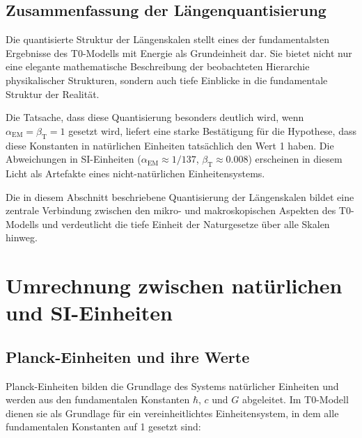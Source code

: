 \documentclass[12pt,a4paper]{article}
\newcommand{\alphaEM}{\alpha_{\text{EM}}}
\newcommand{\betaT}{\beta_{\text{T}}}
\begin{document}
	\subsection{Zusammenfassung der Längenquantisierung}
	
	Die quantisierte Struktur der Längenskalen stellt eines der fundamentalsten Ergebnisse des T0-Modells mit Energie als Grundeinheit dar. Sie bietet nicht nur eine elegante mathematische Beschreibung der beobachteten Hierarchie physikalischer Strukturen, sondern auch tiefe Einblicke in die fundamentale Struktur der Realität.
	
	Die Tatsache, dass diese Quantisierung besonders deutlich wird, wenn $\alphaEM = \betaT = 1$ gesetzt wird, liefert eine starke Bestätigung für die Hypothese, dass diese Konstanten in natürlichen Einheiten tatsächlich den Wert 1 haben. Die Abweichungen in SI-Einheiten ($\alphaEM \approx 1/137$, $\betaT \approx 0.008$) erscheinen in diesem Licht als Artefakte eines nicht-natürlichen Einheitensystems.
	
	Die in diesem Abschnitt beschriebene Quantisierung der Längenskalen bildet eine zentrale Verbindung zwischen den mikro- und makroskopischen Aspekten des T0-Modells und verdeutlicht die tiefe Einheit der Naturgesetze über alle Skalen hinweg.
	\section{Umrechnung zwischen natürlichen und SI-Einheiten}
	
	\subsection{Planck-Einheiten und ihre Werte}
	
	Planck-Einheiten bilden die Grundlage des Systems natürlicher Einheiten und werden aus den fundamentalen Konstanten $\hbar$, $c$ und $G$ abgeleitet. Im T0-Modell dienen sie als Grundlage für ein vereinheitlichtes Einheitensystem, in dem alle fundamentalen Konstanten auf 1 gesetzt sind:
	
\end{document}
